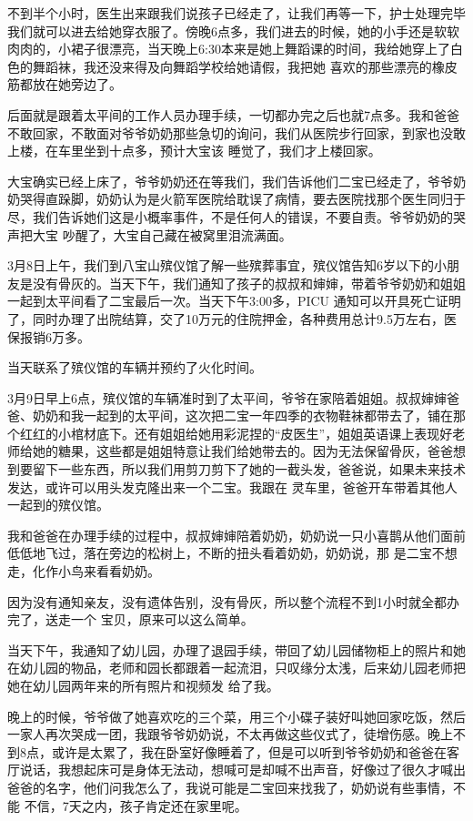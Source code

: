 \documentclass{article}
\begin{document}
不到半个小时，医生出来跟我们说孩子已经走了，让我们再等一下，护士处理完毕我们就可以进去给她穿衣服了。傍晚6点多，我们进去的时候，她的小手还是软软肉肉的，小裙子很漂亮，当天晚上6:30本来是她上舞蹈课的时间，我给她穿上了白色的舞蹈袜，我还没来得及向舞蹈学校给她请假，我把她
喜欢的那些漂亮的橡皮筋都放在她旁边了。 

\newpage

后面就是跟着太平间的工作人员办理手续，一切都办完之后也就7点多。我和爸爸不敢回家，不敢面对爷爷奶奶那些急切的询问，我们从医院步行回家，到家也没敢上楼，在车里坐到十点多，预计大宝该
睡觉了，我们才上楼回家。 

大宝确实已经上床了，爷爷奶奶还在等我们，我们告诉他们二宝已经走了，爷爷奶奶哭得直跺脚，奶奶认为是火箭军医院给耽误了病情，要去医院找那个医生同归于尽，我们告诉她们这是小概率事件，不是任何人的错误，不要自责。爷爷奶奶的哭声把大宝
吵醒了，大宝自己藏在被窝里泪流满面。 

3月8日上午，我们到八宝山殡仪馆了解一些殡葬事宜，殡仪馆告知6岁以下的小朋友是没有骨灰的。当天下午，我们通知了孩子的叔叔和婶婶，带着爷爷奶奶和姐姐一起到太平间看了二宝最后一次。当天下午3:00多，PICU 通知可以开具死亡证明了，同时办理了出院结算，交了10万元的住院押金，各种费用总计9.5万左右，医保报销6万多。

\newpage
当天联系了殡仪馆的车辆并预约了火化时间。 

3月9日早上6点，殡仪馆的车辆准时到了太平间，爷爷在家陪着姐姐。叔叔婶婶爸爸、奶奶和我一起到的太平间，这次把二宝一年四季的衣物鞋袜都带去了，铺在那个红红的小棺材底下。还有姐姐给她用彩泥捏的“皮医生”，姐姐英语课上表现好老师给她的糖果，这些都是姐姐特意让我们给她带去的。因为无法保留骨灰，爸爸想到要留下一些东西，所以我们用剪刀剪下了她的一截头发，爸爸说，如果未来技术发达，或许可以用头发克隆出来一个二宝。我跟在
灵车里，爸爸开车带着其他人一起到的殡仪馆。 

我和爸爸在办理手续的过程中，叔叔婶婶陪着奶奶，奶奶说一只小喜鹊从他们面前低低地飞过，落在旁边的松树上，不断的扭头看着奶奶，奶奶说，那
是二宝不想走，化作小鸟来看看奶奶。 

因为没有通知亲友，没有遗体告别，没有骨灰，所以整个流程不到1小时就全都办完了，送走一个
宝贝，原来可以这么简单。 

\newpage

当天下午，我通知了幼儿园，办理了退园手续，带回了幼儿园储物柜上的照片和她在幼儿园的物品，老师和园长都跟着一起流泪，只叹缘分太浅，后来幼儿园老师把她在幼儿园两年来的所有照片和视频发
给了我。 

晚上的时候，爷爷做了她喜欢吃的三个菜，用三个小碟子装好叫她回家吃饭，然后一家人再次哭成一团，我跟爷爷奶奶说，不太再做这些仪式了，徒增伤感。晚上不到8点，或许是太累了，我在卧室好像睡着了，但是可以听到爷爷奶奶和爸爸在客厅说话，我想起床可是身体无法动，想喊可是却喊不出声音，好像过了很久才喊出爸爸的名字，他们问我怎么了，我说可能是二宝回来找我了，奶奶说有些事情，不能
不信，7天之内，孩子肯定还在家里呢。 
\end{document}
